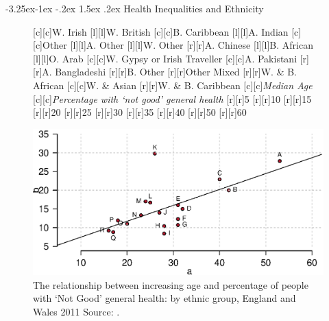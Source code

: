 \documentclass[11 pt, a4paper]{report}
\makeatletter
\renewcommand\subsection{\@startsection{subsection}{2}{\z@}%
                                     {-3.25ex\@plus -1ex \@minus -.2ex}%
                                     {1.5ex \@plus .2ex}%
    								{\large\scshape}}
\makeatother
\begin{document}
\subsection{Health Inequalities and Ethnicity}
\begin{figure}[hbtp!]
[c][c]{\tiny{W. Irish}}
[l][l]{\tiny{W. British}}
[c][c]{\tiny{B. Caribbean}}
[l][l]{\tiny{A. Indian}}
[c][c]{\tiny{Other}}
[l][l]{\tiny{A. Other}}
[l][l]{\tiny{W. Other}}
[r][r]{\tiny{A. Chinese}}
[l][l]{\tiny{B. African}}
[l][l]{\tiny{O. Arab}}
[c][c]{\tiny{W. Gypsy or Irish Traveller}}
[c][c]{\tiny{A. Pakistani}}
[r][r]{\tiny{A. Bangladeshi}}
[r][r]{\tiny{B. Other}}
[r][r]{\tiny{Other Mixed}}
[r][r]{\tiny{W. \& B. African}}
[c][c]{\tiny{W. \& Asian}}
[r][r]{\tiny{W. \& B. Caribbean}}
[c][c]{\small{\emph{Median Age}}}
[c][c]{\small{\emph{Percentage with `not good' general health}}}
[r][r]{\scriptsize{5}}
[r][r]{\scriptsize{10}}
[r][r]{\scriptsize{15}}
[r][r]{\scriptsize{20}}
[r][r]{\scriptsize{25}}
[r][r]{\scriptsize{30}}
[r][r]{\scriptsize{35}}
[r][r]{\scriptsize{40}}
[r][r]{\scriptsize{50}}
[r][r]{\scriptsize{60}}

\includegraphics[width=\textwidth]{../figures/Fig8.8.eps}
\caption{The relationship between increasing age and percentage of people with ‘Not Good’ general health: by ethnic group, England and Wales 2011 Source: \citet{ONS2013}.
}\label{Fig:N10}%
\end{figure}
\end{document}
